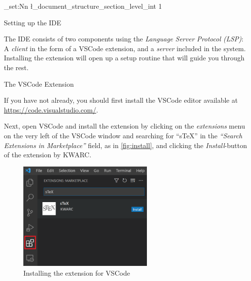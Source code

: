 \ExplSyntaxOn
\int_set:Nn \l_document_structure_section_level_int {1}
\ExplSyntaxOff

\clearpage

{%
  \def\\{:}%
  \tableofcontents
}

\clearpage
{}

\stexidetrue
	
\fi

\long{}

\begin{sfragment}{Setting up the \sTeX IDE}

  \ifstexide\bigskip\fi


  The \sTeX IDE consists of two components using the 
  \emph{Language Server Protocol (LSP)}: A \emph{client}
  in the form of a VSCode extension, and a \emph{server}
  included in the \mmt system. Installing the extension will
  open up a setup routine that will guide you through the rest.

  \begin{sfragment}{The \sTeX VSCode Extension}

    If you have not already, you should first install the VSCode editor 
    available at \url{https://code.visualstudio.com/}.

    Next, open VSCode and install the \sTeX extension by clicking on
    the \emph{extensions} menu on the very left of the VSCode window
    and searching for ``sTeX'' in the 
    \emph{``Search Extensions in Marketplace''} field, as in
    \autoref{fig:install}, and clicking the \emph{Install}-button
    of the \sTeX extension by KWARC.

    \begin{figure}
      \begin{center}
        \includegraphics[width=0.6\textwidth]{img/vsc1.png}
      \end{center}
      \caption{Installing the \sTeX extension for VSCode}\label{fig:install}
    \end{figure}


\end{sfragment}
\end{sfragment}
